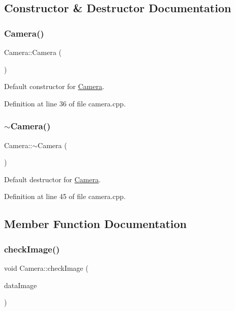 \subsection{Constructor \& Destructor Documentation}
\mbox{\label{class_camera_a01f94c3543f56ede7af49dc778f19331}} 
\subsubsection{\texorpdfstring{Camera()}{Camera()}}
{\footnotesize\ttfamily Camera\+::\+Camera (\begin{DoxyParamCaption}{ }\end{DoxyParamCaption})}



Default constructor for \mbox{\hyperlink{class_camera}{Camera}}. 



Definition at line 36 of file camera.\+cpp.

\mbox{\label{class_camera_ad1897942d0ccf91052386388a497349f}} 
\subsubsection{\texorpdfstring{$\sim$\+Camera()}{~Camera()}}
{\footnotesize\ttfamily Camera\+::$\sim$\+Camera (\begin{DoxyParamCaption}{ }\end{DoxyParamCaption})}



Default destructor for \mbox{\hyperlink{class_camera}{Camera}}. 



Definition at line 45 of file camera.\+cpp.



\subsection{Member Function Documentation}
\mbox{\label{class_camera_a0b67f2af6df1296fb25f3b0e160cc99f}} 
\subsubsection{\texorpdfstring{check\+Image()}{checkImage()}}
{\footnotesize\ttfamily void Camera\+::check\+Image (\begin{DoxyParamCaption}\item[{const sensor\+\_\+msgs\+::\+Image\+::\+Const\+Ptr \&}]{data\+Image }\end{DoxyParamCaption})}



